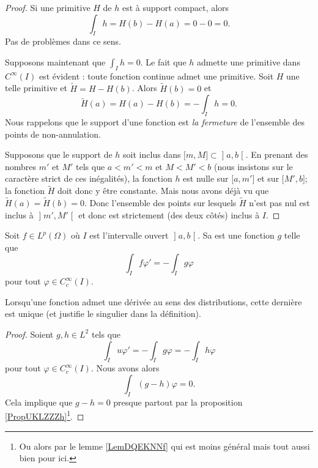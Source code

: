 \begin{proof}
    Si une primitive \( H\) de \( h\) est à support compact, alors
    \begin{equation}
        \int_Ih=H(b)-H(a)=0-0=0.
    \end{equation}
    Pas de problèmes dans ce sens.

    Supposons maintenant que \( \int_Ih=0\). Le fait que \( h\) admette une primitive dans \(  C^{\infty}(I)\) est évident : toute fonction continue admet une primitive. Soit \( H\) une telle primitive et \( \tilde H=H-H(b)\). Alors \( \tilde H(b)=0\) et 
    \begin{equation}
        \tilde H(a)=H(a)-H(b)=-\int_Ih=0.
    \end{equation}
    Nous rappelons que le support d'une fonction est \emph{la fermeture} de l'ensemble des points de non-annulation.

    Supposons que le support de \( h\) soit inclus dans \( \mathopen[ m , M \mathclose]\subset\mathopen] a , b \mathclose[\). En prenant des nombres \( m'\) et \( M'\) tels que \( a<m'<m\) et \( M<M'<b\) (nous insistons sur le caractère strict de ces inégalités), la fonction \( h\) est nulle sur \( \mathopen[ a , m' \mathclose]\) et sur \( \mathopen[ M' , b \mathclose]\); la fonction \( \tilde H\) doit donc y être constante. Mais nous avons déjà vu que \( \tilde H(a)=\tilde H(b)=0\). Donc l'ensemble des points sur lesquels \( \tilde H\) n'est pas nul est inclus à \( \mathopen] m' , M' \mathclose[\) et donc est strictement (des deux côtés) inclus à \( I\).
\end{proof}


\begin{definition}
    Soit \( f\in L^p(\Omega)\) où \( I\) est l'intervalle ouvert \( \mathopen] a , b \mathclose[\). Sa  est une fonction \( g\) telle que
        \begin{equation}
            \int_If\varphi'=-\int_Ig\varphi
        \end{equation}
        pour tout \( \varphi\in C^{\infty}_c(I)\).
\end{definition}

\begin{lemma}
    Lorsqu'une fonction admet une dérivée au sens des distributions, cette dernière est unique (et justifie le singulier dans la définition).
\end{lemma}

\begin{proof}
    Soient \( g,h\in L^2\) tels que 
    \begin{equation}
        \int_Iu\varphi'=-\int_Ig\varphi=-\int_Ih\varphi
    \end{equation}
    pour tout \( \varphi\in C^{\infty}_c(I)\). Nous avons alors
    \begin{equation}
        \int_I(g-h)\varphi=0.
    \end{equation}
    Cela implique que \( g-h=0\) presque partout par la proposition \ref{PropUKLZZZh}\footnote{Ou alors par le lemme \ref{LemDQEKNNf} qui est moins général mais tout aussi bien pour ici.}.
\end{proof}


